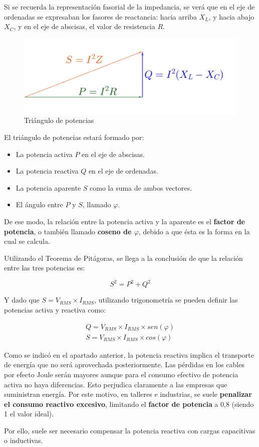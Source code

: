 Si se recuerda la representación fasorial de la impedancia, se verá que en el eje de ordenadas se expresaban los fasores de reactancia: hacia arriba $X_L$, y hacia abajo $X_C$, y en el eje de abscisas, el valor de resistencia $R$.

\begin{figure}[htbp]
  \includegraphics[scale=0.16]{images/triangulo_potencias}
  \caption{Triángulo de potencias}
  \label{fig:triangulo_potencias}
\end{figure}

El triángulo de potencias estará formado por:
\begin{itemize}
	\item La potencia activa $P$ en el eje de abscisas.
	\item La potencia reactiva $Q$ en el eje de ordenadas.
	\item La potencia aparente $S$ como la suma de ambos vectores.
	\item El ángulo entre $P$ y $S$, llamado $\varphi$.
\end{itemize}

De ese modo, la relación entre la potencia activa y la aparente es el \textbf{factor de potencia}, o también llamado \textbf{coseno de $\varphi$}, debido a que ésta es la forma en la cual se calcula.

Utilizando el Teorema de Pitágoras, se llega a la conclusión de que la relación entre las tres potencias es:

\begin{equation}
	\label{eq:potencias_alterna}
	S^{2}=P^{2}+Q^{2}
\end{equation}

Y dado que $S=V_{RMS}\times I_{RMS}$, utilizando trigonometría se pueden definir las potencias activa y reactiva como:

\begin{eqnarray}
	\label{eq:potencias_activa_reactiva}
	Q=V_{RMS}\times I_{RMS} \times sen(\varphi) \\
	S=V_{RMS}\times I_{RMS} \times cos(\varphi)
\end{eqnarray}

Como se indicó en el apartado anterior, la potencia reactiva implica el transporte de energía que no será aprovechada posteriormente. Las pérdidas en los cables por efecto Joule serán mayores aunque para el consumo efectivo de potencia activa no haya diferencias. Esto perjudica claramente a las empresas que suministran energía. Por este motivo, en talleres e industrias, se suele \textbf{penalizar el consumo reactivo excesivo}, limitando el \textbf{factor de potencia} a 0,8 (siendo 1 el valor ideal).

Por ello, suele ser necesario compensar la potencia reactiva con cargas capacitivas o inductivas.  
